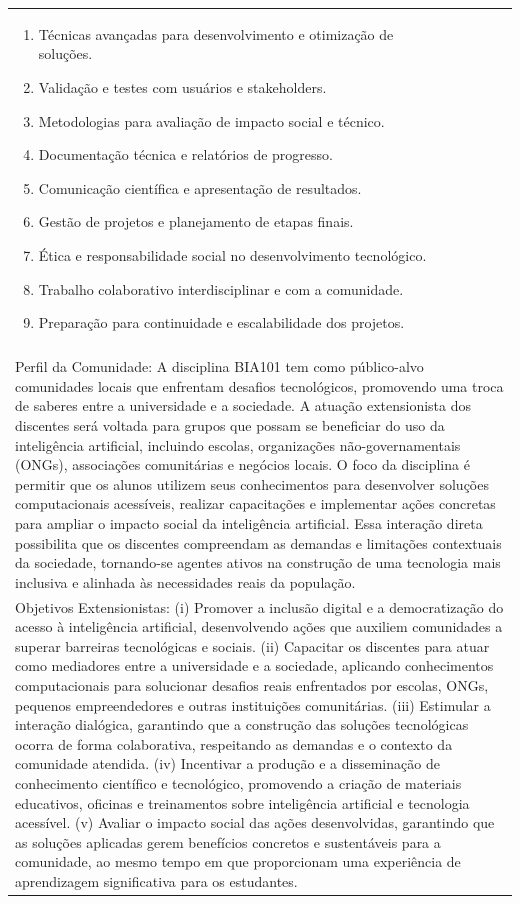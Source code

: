 \documentclass[11pt]{article}
\begin{document}
\begin{center}
\begin{longtable}{|p{4cm}|p{4cm}|p{4cm}|p{4cm}|}
{\begin{enumerate}
\item Técnicas avançadas para desenvolvimento e otimização de soluções.
\item Validação e testes com usuários e stakeholders.
\item Metodologias para avaliação de impacto social e técnico.
\item Documentação técnica e relatórios de progresso.
\item Comunicação científica e apresentação de resultados.
\item Gestão de projetos e planejamento de etapas finais.
\item Ética e responsabilidade social no desenvolvimento tecnológico.
\item Trabalho colaborativo interdisciplinar e com a comunidade.
\item Preparação para continuidade e escalabilidade dos projetos.\end{enumerate}}\\
\multicolumn{4}{|p{16cm}|}{}\\
\multicolumn{4}{|p{16cm}|}{Perfil da Comunidade: A disciplina BIA101 tem como público-alvo comunidades locais que enfrentam desafios tecnológicos, promovendo uma troca de saberes entre a universidade e a sociedade. A atuação extensionista dos discentes será voltada para grupos que possam se beneficiar do uso da inteligência artificial, incluindo escolas, organizações não-governamentais (ONGs), associações comunitárias e negócios locais. O foco da disciplina é permitir que os alunos utilizem seus conhecimentos para desenvolver soluções computacionais acessíveis, realizar capacitações e implementar ações concretas para ampliar o impacto social da inteligência artificial. Essa interação direta possibilita que os discentes compreendam as demandas e limitações contextuais da sociedade, tornando-se agentes ativos na construção de uma tecnologia mais inclusiva e alinhada às necessidades reais da população.}\\
\multicolumn{4}{|p{16cm}|}{Objetivos Extensionistas: (i) Promover a inclusão digital e a democratização do acesso à inteligência artificial, desenvolvendo ações que auxiliem comunidades a superar barreiras tecnológicas e sociais. (ii) Capacitar os discentes para atuar como mediadores entre a universidade e a sociedade, aplicando conhecimentos computacionais para solucionar desafios reais enfrentados por escolas, ONGs, pequenos empreendedores e outras instituições comunitárias. (iii) Estimular a interação dialógica, garantindo que a construção das soluções tecnológicas ocorra de forma colaborativa, respeitando as demandas e o contexto da comunidade atendida. (iv) Incentivar a produção e a disseminação de conhecimento científico e tecnológico, promovendo a criação de materiais educativos, oficinas e treinamentos sobre inteligência artificial e tecnologia acessível. (v) Avaliar o impacto social das ações desenvolvidas, garantindo que as soluções aplicadas gerem benefícios concretos e sustentáveis para a comunidade, ao mesmo tempo em que proporcionam uma experiência de aprendizagem significativa para os estudantes.}\\

\end{longtable}
\end{center}
\end{document}
